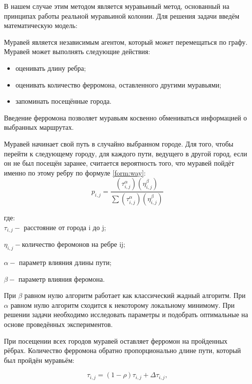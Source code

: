 В нашем случае этим методом является муравьиный метод, основанный на принципах работы реальной муравьиной колонии. Для решения задачи введём математическую модель:

Муравей является независимым агентом, который может перемещаться по графу. Муравей может выполнять следующие действия:
\begin{itemize}
	\item оценивать длину ребра;
	\item оценивать количество ферромона, оставленного другими муравьями;
	\item запоминать посещённые города.
\end{itemize}

Введение ферромона позволяет муравьям косвенно обмениваться информацией о выбранных маршрутах. 

Муравей начинает свой путь в случайно выбранном городе. Для того, чтобы перейти к следующему городу, для каждого пути, ведущего в другой город, если он не был посещён заранее, считается вероятность того, что муравей пойдёт именно по этому ребру по формуле \ref{form:way}:\\   
\begin{equation}\label{form:way} 
	p_{i,j}={\frac {(\tau_{i,j}^{\alpha })(\eta_{i,j}^{\beta })}{\sum (\tau_{i,j}^{\alpha })(\eta_{i,j}^{\beta })}}
\end{equation}

где:\\

$\tau_{i,j} - $ расстояние от города i до j;
    
$\eta_{i,j} - $количество феромонов на ребре ij;
         
$\alpha - $ параметр влияния длины пути;
          
$\beta - $ параметр влияния феромона.

При $\beta$ равном нулю алгоритм работает как классический жадный алгоритм. При $\alpha$ равном нулю алгоритм сходится к некоторому локальному минимому. При решении задачи необходимо исследовать параметры и подобрать оптимальные на основе проведённых экспериментов.

При посещении всех городов муравей оставляет ферромон на пройденных рёбрах. Количество ферромона обратно пропорционально длине пути, который был пройдён муравьём:

\begin{equation}\label{form:eva} 
    \tau_{i,j}=(1-\rho )\tau_{i,j}+\Delta \tau_{i,j},
\end{equation}

